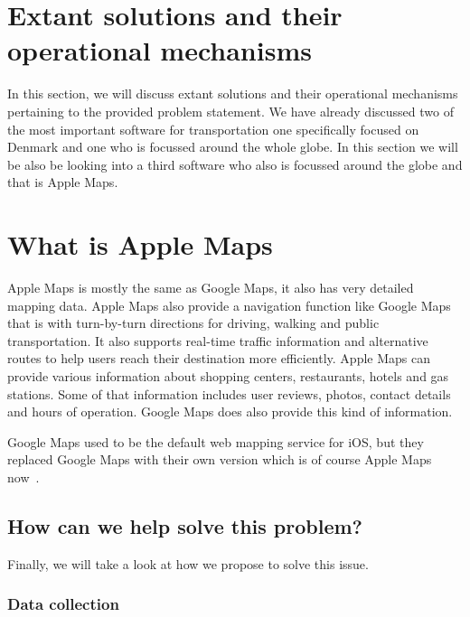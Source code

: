 \section{Extant solutions and their operational mechanisms}\label{sec:extant-solutions-and-their-operational-mechanisms}

In this section, we will discuss extant solutions and their operational mechanisms pertaining to the provided problem
statement.
We have already discussed two of the most important software for transportation one specifically focused on Denmark and
one who is focussed around the whole globe.
In this section we will be also be looking into a third software who also is focussed around the globe and that is
Apple Maps.


\section{What is Apple Maps}\label{sec:what-is-apple-maps}

Apple Maps is mostly the same as Google Maps, it also has very detailed mapping data.
Apple Maps also provide a navigation function like Google Maps that is with turn-by-turn directions for driving, walking
and public transportation.
It also supports real-time traffic information and alternative routes to help users reach their destination more
efficiently.
Apple Maps can provide various information about shopping centers, restaurants, hotels and gas stations.
Some of that information includes user reviews, photos, contact details and hours of operation.
Google Maps does also provide this kind of information.

Google Maps used to be the default web mapping service for iOS, but they replaced Google Maps with their own version
which is of course Apple Maps now~\cite{applemaps2023}.

\subsection{How can we help solve this problem?}\label{subsec:how-can-we-help-solve-this-problem?}

Finally, we will take a look at how we propose to solve this issue.

\subsubsection{Data collection}

